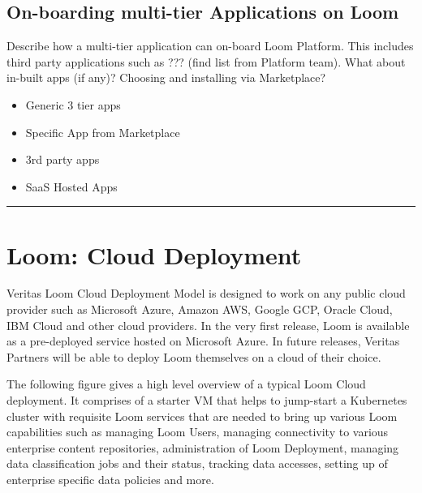 \documentclass[letterpaper,10pt,english]{sphinxmanual}
\begin{document}
\section{On-boarding multi-tier Applications on Loom}
\label{\detokenize{loom_installation_guide:on-boarding-multi-tier-applications-on-loom}}
Describe how a multi-tier application can on-board Loom Platform.  This includes third party applications such as ??? (find list from Platform team). What about in-built apps (if any)? Choosing and installing via Marketplace?
\begin{itemize}
\item {} 
Generic 3 tier apps

\item {} 
Specific App \textendash{} from Marketplace

\item {} 
3rd party apps

\item {} 
SaaS Hosted Apps

\end{itemize}


\bigskip\hrule\bigskip



\chapter{Loom: Cloud Deployment}
\label{\detokenize{loom_installation_guide:loom-cloud-deployment}}

Veritas Loom Cloud Deployment Model is designed to work on any public cloud provider such as Microsoft Azure, Amazon AWS, Google GCP, Oracle Cloud, IBM Cloud and other cloud providers.  In the very first release, Loom is available as a pre-deployed service hosted on Microsoft Azure.  In future releases, Veritas Partners will be able to deploy Loom themselves on a cloud of their choice.


The following figure gives a high level overview of a typical Loom Cloud deployment.  It comprises of a starter VM that helps to jump-start a Kubernetes cluster with requisite Loom services that are needed to bring up various Loom capabilities
such as managing Loom Users, managing connectivity to various enterprise content repositories, administration of Loom Deployment, managing data classification jobs and their status, tracking data accesses, setting up of enterprise specific data policies and more.
\end{document}

